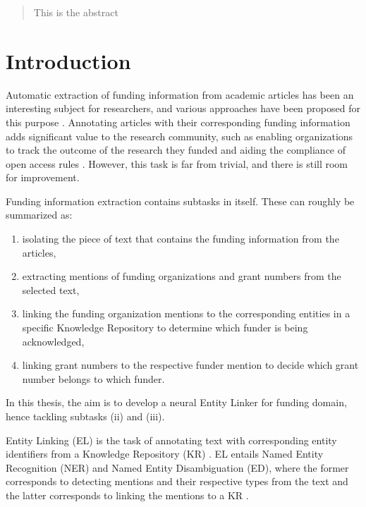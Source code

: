 \documentclass{report}
\theoremstyle{definition}
\theoremstyle{remark}
\begin{document}
\newpage
\begin{abstract}
    This is the abstract
\end{abstract}
\newpage
\chapter{Introduction}
\label{sec:intro}
Automatic extraction of funding information from academic articles has been an interesting subject for researchers, and various approaches have been proposed for this purpose \cite{ElsPaper,AckExtract,GrantExtractor}. Annotating articles with their corresponding funding information adds significant value to the research community, such as enabling organizations to track the outcome of the research they funded \cite{ElsPaper} and aiding the compliance of open access rules \cite{GrantExtractor}. However, this task is far from trivial, and there is still room for improvement.

Funding information extraction contains subtasks in itself. These can roughly be summarized as:
\renewcommand{\labelenumi}{(\roman{enumi})}
\begin{enumerate}
     \vspace{-0.3cm}\item isolating the piece of text that contains the funding information from the articles,
     \vspace{-0.6cm}\item extracting mentions of funding organizations and grant numbers from the selected text,
     \vspace{-0.3cm}\item linking the funding organization mentions to the corresponding entities in a specific Knowledge Repository to determine which funder is being acknowledged,
     \vspace{-0.3cm}\item linking grant numbers to the respective funder mention to decide which grant number belongs to which funder. 
\end{enumerate}

\vspace{-0.3cm}\noindent In this thesis, the aim is to develop a neural Entity Linker for funding domain, hence tackling subtasks (ii) and (iii).


Entity Linking (EL) is the task of annotating text with corresponding entity identifiers from a Knowledge Repository (KR) \cite{balog}. EL entails Named Entity Recognition (NER) and Named Entity Disambiguation (ED), where the former corresponds to detecting mentions and their respective types from the text and the latter corresponds to linking the mentions to a KR \cite{balog}. 
\end{document}
